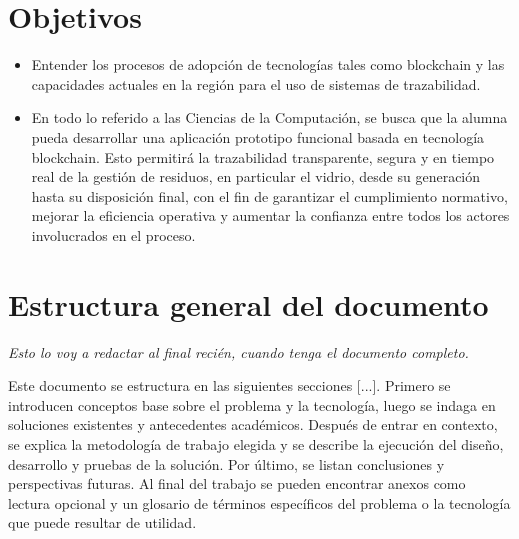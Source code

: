 \section{Objetivos}

\begin{itemize}
	\item Entender los procesos de adopción de tecnologías tales como blockchain y las capacidades actuales en la región para el uso de sistemas de trazabilidad.
	\item En todo lo referido a las Ciencias de la Computación, se busca que la alumna pueda desarrollar una aplicación prototipo funcional basada en tecnología blockchain. Esto permitirá la trazabilidad transparente, segura y en tiempo real de la gestión de residuos, en particular el vidrio, desde su generación hasta su disposición final, con el fin de garantizar el cumplimiento normativo, mejorar la eficiencia operativa y aumentar la confianza entre todos los actores involucrados en el proceso.
\end{itemize}

\section{Estructura general del documento}


\begin{block}[todo]
    \textit{Esto lo voy a redactar al final recién, cuando tenga el documento completo.}
\end{block}

Este documento se estructura en las siguientes secciones [...]. Primero se introducen conceptos base sobre el problema y la tecnología, luego se indaga en soluciones existentes y antecedentes académicos. Después de entrar en contexto, se explica la metodología de trabajo elegida y se describe la ejecución del diseño, desarrollo y pruebas de la solución. Por último, se listan conclusiones y perspectivas futuras. Al final del trabajo se pueden encontrar anexos como lectura opcional y un glosario de términos específicos del problema o la tecnología que puede resultar de utilidad.
